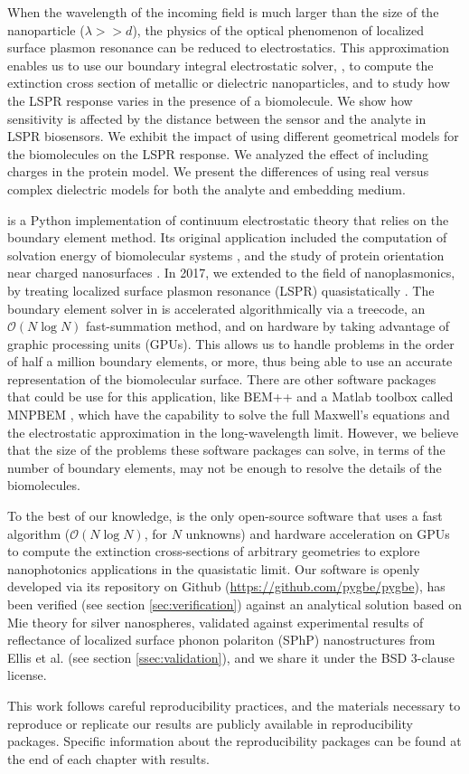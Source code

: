 When the wavelength of the incoming field is much larger than the size of the nanoparticle ($\lambda>>d$), the physics of the optical phenomenon of 
localized surface plasmon resonance can be reduced to electrostatics. This approximation enables us to use our boundary integral 
electrostatic solver, \pygbe, to compute the extinction cross section of metallic or dielectric nanoparticles, and to study how the LSPR response varies in the 
presence of a biomolecule. We show how sensitivity is affected by the distance between the sensor and the analyte in LSPR biosensors. We exhibit the impact 
of using different geometrical models for the biomolecules on the LSPR response. We analyzed the effect of including charges in the protein model. We present 
the differences of using real versus complex dielectric models for both the analyte and embedding medium.

\pygbe is a Python implementation of continuum electrostatic theory that relies on the boundary element method. Its original application included 
the computation of solvation energy of biomolecular systems \cite{CooperBardhanBarba2013}, and the study of protein orientation near charged 
nanosurfaces \cite{CooperClementiBarba2015}. In 2017, we extended \pygbe to the field of nanoplasmonics, by treating localized surface plasmon resonance 
(LSPR) quasistatically \cite{ClementiETal2017}. The boundary element solver in \pygbe is accelerated algorithmically via a treecode, an $\mathcal{O}(N\log N)$ 
fast-summation method, and on hardware by taking advantage of graphic processing units (GPUs). This allows us to handle problems in the order of half a million 
boundary elements, or more, thus being able to use an accurate representation of the biomolecular surface. There are other software packages that could be use 
for this application, like BEM++ \cite{SmigajETal2015} and a Matlab toolbox called MNPBEM \cite{HohenesterTrugler2012}, which have the capability to solve the 
full Maxwell's equations and the electrostatic approximation in the long-wavelength limit. However, we believe that the size of the
problems these software packages can solve, in terms of the number of boundary elements,  may not be enough to resolve the details of the biomolecules.

 
To the best of our knowledge, \pygbe is the only open-source software that uses a fast algorithm ($\mathcal{O}(N\log N)$,
for $N$ unknowns) and hardware acceleration on GPUs to compute the extinction cross-sections of arbitrary geometries to explore
nanophotonics applications in the quasistatic limit. Our software is openly developed via its repository on 
Github (\url{https://github.com/pygbe/pygbe}), has been verified (see section \ref{sec:verification}) against an analytical solution based 
on Mie theory for silver nanospheres, validated against experimental results of reflectance of localized surface phonon polariton 
(SPhP) nanostructures from Ellis et al. (see section \ref{ssec:validation}), and we share it under the BSD 3-clause license.

This work follows careful reproducibility practices, and the materials necessary to reproduce or replicate our results are publicly available in 
reproducibility packages. Specific information about the reproducibility packages can be found at the end of each chapter with results. 
